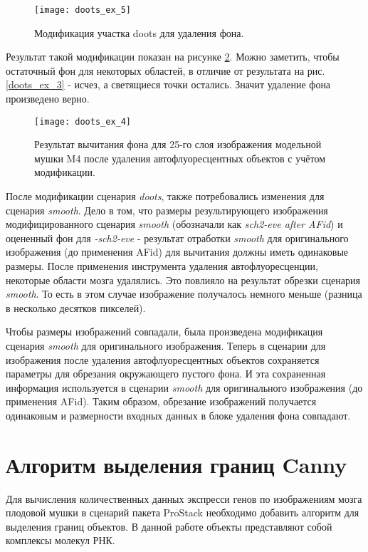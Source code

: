 \begin{figure}[H]
	\centering
	\texttt{[image: doots\_ex\_5]}
	\caption{Модификация участка doots для удаления фона.}
	\label{doots_ex_5}
\end{figure}

Результат такой модификации показан на рисунке \ref{doots_ex_4}. Можно заметить, чтобы остаточный фон для некоторых областей, в отличие от результата на рис. \ref{doots_ex_3} - исчез, а светящиеся точки остались. Значит удаление фона произведено верно.

\begin{figure}[H]
	\centering
	\texttt{[image: doots\_ex\_4]}
	\caption{Результат вычитания фона для 25-го слоя изображения модельной мушки M4 после удаления автофлуоресцентных объектов с учётом модификации.}
	\label{doots_ex_4}
\end{figure}



После модификации сценария \textit{doots}, также потребовались изменения для сценария \textit{smooth}. Дело в том, что размеры результирующего изображения модифицированного сценария \textit{smooth} (обозначали как \textit{sch2-eve after AFid}) и оцененный фон для \textit{-sch2-eve} - результат отработки \textit{smooth} для оригинального изображения (до применения AFid) для вычитания должны иметь одинаковые размеры. После применения инструмента удаления автофлуоресценции, некоторые области мозга удалялись. Это повлияло на результат обрезки сценария \textit{smooth}. То есть в этом случае изображение получалось немного меньше (разница в несколько десятков пикселей). 

Чтобы размеры изображений совпадали, была произведена модификация сценария \textit{smooth} для оригинального изображения. Теперь в сценарии для изображения после удаления автофлуоресцентных объектов сохраняется параметры для обрезания окружающего пустого фона. И эта сохраненная информация используется в сценарии \textit{smooth} для оригинального изображения (до применения AFid). Таким образом, обрезание изображений получается одинаковым и размерности входных данных в блоке удаления фона совпадают.


\section{Алгоритм выделения границ Canny}
Для вычисления количественных данных экспресси генов по изображениям мозга плодовой мушки в сценарий пакета ProStack необходимо добавить алгоритм для выделения границ объектов. В данной работе объекты представляют собой комплексы молекул РНК.

